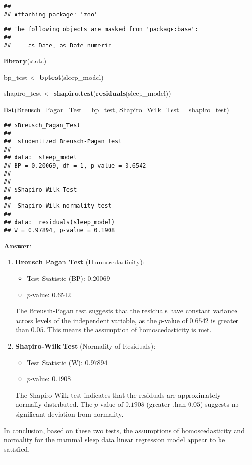 \documentclass[
]{article}
\newenvironment{Shaded}{\begin{snugshade}}{\end{snugshade}}
\newcommand{\AttributeTok}[1]{\textcolor[rgb]{0.13,0.29,0.53}{#1}}
\newcommand{\FunctionTok}[1]{\textcolor[rgb]{0.13,0.29,0.53}{\textbf{#1}}}
\newcommand{\NormalTok}[1]{#1}
\newcommand{\OtherTok}[1]{\textcolor[rgb]{0.56,0.35,0.01}{#1}}
\providecommand{\tightlist}{%
  \setlength{\itemsep}{0pt}\setlength{\parskip}{0pt}}
\begin{document}
\begin{verbatim}
## 
## Attaching package: 'zoo'
\end{verbatim}

\begin{verbatim}
## The following objects are masked from 'package:base':
## 
##     as.Date, as.Date.numeric
\end{verbatim}

\begin{Shaded}
\begin{Highlighting}[]
\FunctionTok{library}\NormalTok{(stats)}

\NormalTok{bp\_test }\OtherTok{\textless{}{-}} \FunctionTok{bptest}\NormalTok{(sleep\_model)}

\NormalTok{shapiro\_test }\OtherTok{\textless{}{-}} \FunctionTok{shapiro.test}\NormalTok{(}\FunctionTok{residuals}\NormalTok{(sleep\_model))}

\FunctionTok{list}\NormalTok{(}\AttributeTok{Breusch\_Pagan\_Test =}\NormalTok{ bp\_test, }\AttributeTok{Shapiro\_Wilk\_Test =}\NormalTok{ shapiro\_test)}
\end{Highlighting}
\end{Shaded}

\begin{verbatim}
## $Breusch_Pagan_Test
## 
##  studentized Breusch-Pagan test
## 
## data:  sleep_model
## BP = 0.20069, df = 1, p-value = 0.6542
## 
## 
## $Shapiro_Wilk_Test
## 
##  Shapiro-Wilk normality test
## 
## data:  residuals(sleep_model)
## W = 0.97894, p-value = 0.1908
\end{verbatim}

\textbf{Answer:}

\begin{enumerate}
\def\labelenumi{\arabic{enumi}.}
\item
  \textbf{Breusch-Pagan Test} (Homoscedasticity):

  \begin{itemize}
  \tightlist
  \item
    Test Statistic (BP): \(0.20069\)
  \item
    \(p\)-value: \(0.6542\)
  \end{itemize}

  The Breusch-Pagan test suggests that the residuals have constant
  variance across levels of the independent variable, as the \(p\)-value
  of \(0.6542\) is greater than \(0.05\). This means the assumption of
  homoscedasticity is met.
\item
  \textbf{Shapiro-Wilk Test} (Normality of Residuals):

  \begin{itemize}
  \tightlist
  \item
    Test Statistic (W): \(0.97894\)
  \item
    \(p\)-value: \(0.1908\)
  \end{itemize}

  The Shapiro-Wilk test indicates that the residuals are approximately
  normally distributed. The \(p\)-value of \(0.1908\) (greater than
  \(0.05\)) suggests no significant deviation from normality.
\end{enumerate}

In conclusion, based on these two tests, the assumptions of
homoscedasticity and normality for the mammal sleep data linear
regression model appear to be satisfied.

\begin{center}\rule{0.5\linewidth}{0.5pt}\end{center}
\end{document}
